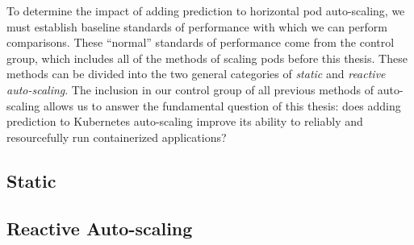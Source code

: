 To determine the impact of adding prediction to horizontal pod auto-scaling, we
must establish baseline standards of performance with which we can perform comparisons.
These ``normal'' standards of performance come from the control group, which
includes all of the methods of scaling pods before this thesis. These methods
can be divided into the two general categories of \textit{static} and
\textit{reactive auto-scaling}. The inclusion in our control group of all
previous methods of auto-scaling allows us to answer the fundamental question of
this thesis: does adding prediction to Kubernetes auto-scaling improve its
ability to reliably and resourcefully run containerized applications?

\subsection{Static}



\subsection{Reactive Auto-scaling}


